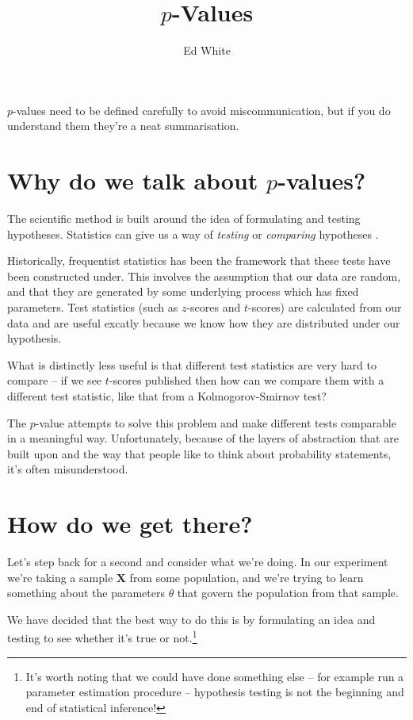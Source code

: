 \documentclass{tufte-handout}
\title{$p$-Values}
\author{Ed White}
\date{}
\theoremstyle{plain}
\theoremstyle{definition}
\newcommand{\XX}{\mathbf{X}}
\begin{document}
\maketitle

$p$-values need to be defined carefully to avoid miscommunication, but if you do understand them they're a neat summarisation.

\section{Why do we talk about $p$-values?}

The scientific method is built around the idea of formulating and testing hypotheses.
Statistics can give us a way of \textit{testing} or \textit{comparing} hypotheses \cite{casella2021statistical}.

Historically, frequentist statistics has been the framework that these tests have been constructed under.
This involves the assumption that our data are random, and that they are generated by some underlying process which has fixed parameters.
Test statistics (such as $z$-scores and $t$-scores) are calculated from our data and are useful excatly because we know how they are distributed under our hypothesis.

What is distinctly less useful is that different test statistics are very hard to compare -- if we see $t$-scores published then how can we compare them with a different test statistic, like that from a Kolmogorov-Smirnov test?

The $p$-value attempts to solve this problem and make different tests comparable in a meaningful way.
Unfortunately, because of the layers of abstraction that are built upon and the way that people like to think about probability statements, it's often misunderstood.

\section{How do we get there?}

Let's step back for a second and consider what we're doing.
In our experiment we're taking a sample $\XX$ from some population, and we're trying to learn something about the parameters $\theta$ that govern the population from that sample.

We have decided that the best way to do this is by formulating an idea and testing to see whether it's true or not.\footnote{It's worth noting that we could have done something else -- for example run a parameter estimation procedure -- hypothesis testing is not the beginning and end of statistical inference!}
\end{document}

